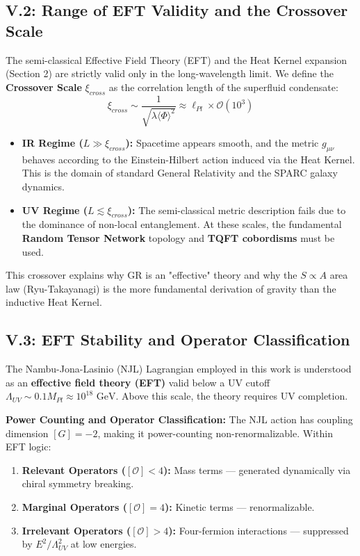 \subsection{V.2: Range of EFT Validity and the Crossover Scale}
The semi-classical Effective Field Theory (EFT) and the Heat Kernel expansion (Section 2) are strictly valid only in the long-wavelength limit. We define the \textbf{Crossover Scale} $\xi_{cross}$ as the correlation length of the superfluid condensate:
\begin{equation}
    \xi_{cross} \sim \frac{1}{\sqrt{\lambda \langle\Phi\rangle^2}} \approx \ell_{Pl} \times \mathcal{O}(10^3)
\end{equation}
\begin{itemize}
    \item \textbf{IR Regime ($L \gg \xi_{cross}$):} Spacetime appears smooth, and the metric $g_{\mu\nu}$ behaves according to the Einstein-Hilbert action induced via the Heat Kernel. This is the domain of standard General Relativity and the SPARC galaxy dynamics.
    \item \textbf{UV Regime ($L \lesssim \xi_{cross}$):} The semi-classical metric description fails due to the dominance of non-local entanglement. At these scales, the fundamental \textbf{Random Tensor Network} topology and \textbf{TQFT cobordisms} must be used.
\end{itemize}
This crossover explains why GR is an "effective" theory and why the $S \propto A$ area law (Ryu-Takayanagi) is the more fundamental derivation of gravity than the inductive Heat Kernel.

\subsection{V.3: EFT Stability and Operator Classification}

The Nambu-Jona-Lasinio (NJL) Lagrangian employed in this work is understood as an \textbf{effective field theory (EFT)} valid below a UV cutoff $\Lambda_{UV} \sim 0.1 M_{Pl} \approx 10^{18} \text{ GeV}$. Above this scale, the theory requires UV completion.

\textbf{Power Counting and Operator Classification:}
The NJL action has coupling dimension $[G] = -2$, making it power-counting non-renormalizable. Within EFT logic:
\begin{enumerate}
    \item \textbf{Relevant Operators ($[\mathcal{O}] < 4$):} Mass terms — generated dynamically via chiral symmetry breaking.
    \item \textbf{Marginal Operators ($[\mathcal{O}] = 4$):} Kinetic terms — renormalizable.
    \item \textbf{Irrelevant Operators ($[\mathcal{O}] > 4$):} Four-fermion interactions — suppressed by $E^2/\Lambda_{UV}^2$ at low energies.
\end{enumerate}

